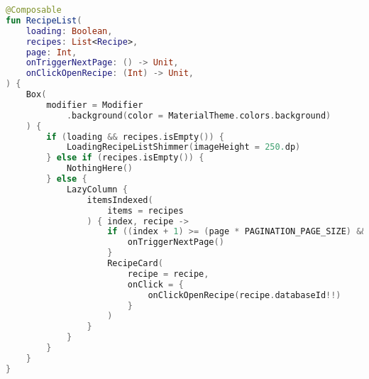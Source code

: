 \begin{lstlisting}[caption={RecipeList},label={lst:recipe_list}, language=kotlin]
@Composable
fun RecipeList(
    loading: Boolean,
    recipes: List<Recipe>,
    page: Int,
    onTriggerNextPage: () -> Unit,
    onClickOpenRecipe: (Int) -> Unit,
) {
    Box(
        modifier = Modifier
            .background(color = MaterialTheme.colors.background)
    ) {
        if (loading && recipes.isEmpty()) {
            LoadingRecipeListShimmer(imageHeight = 250.dp)
        } else if (recipes.isEmpty()) {
            NothingHere()
        } else {
            LazyColumn {
                itemsIndexed(
                    items = recipes
                ) { index, recipe ->
                    if ((index + 1) >= (page * PAGINATION_PAGE_SIZE) && !loading) {
                        onTriggerNextPage()
                    }
                    RecipeCard(
                        recipe = recipe,
                        onClick = {
                            onClickOpenRecipe(recipe.databaseId!!)
                        }
                    )
                }
            }
        }
    }
}

\end{lstlisting}


